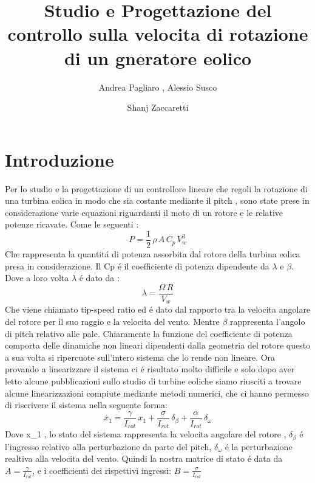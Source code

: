 \documentclass[a4paper,13pt]{article}
\begin{document}
\author{Andrea Pagliaro , Alessio Susco \and Shanj Zaccaretti}
\title{Studio e Progettazione del controllo sulla velocita di rotazione di un gneratore eolico}
\maketitle
\section{Introduzione}
Per lo studio e la progettazione di un controllore lineare che regoli la rotazione di una turbina eolica in modo che sia costante mediante il pitch , sono state prese in considerazione varie equazioni riguardanti il moto di un rotore e le relative potenze ricavate.
Come le seguenti :
\begin{equation}
P=\frac{1}{2}\,\rho\,A\,C_p\,V_w^3
\end{equation}
Che rappresenta la quantit\'a di potenza assorbita dal rotore della turbina eolica presa in considerazione.
Il Cp \'e il coefficiente di potenza dipendente da $\lambda$ e $\beta$.
Dove a loro volta $\lambda$ \'e dato da :
\begin{equation}
\lambda=\frac{\Omega\,R}{V_w}
\end{equation}
Che viene chiamato tip-speed ratio ed \'e dato dal rapporto tra la velocita angolare
del rotore per il suo raggio e la velocita del vento.
Mentre $\beta$ rappresenta l'angolo di pitch relativo alle pale.
Chiaramente la funzione del coefficiente di potenza comporta delle dinamiche non 
lineari dipendenti dalla geometria del rotore questo a sua volta si ripercuote sull'intero sistema che lo rende non lineare.  
Ora provando a linearizzare il sistema ci \'e risultato molto difficile e solo dopo aver letto alcune pubblicazioni sullo studio di turbine eoliche siamo riusciti a trovare alcune linearizzazioni compiute mediante metodi numerici, che ci hanno permesso di riscrivere il sistema nella seguente forma:
\begin{equation}
\dot{x_1}=\frac{\gamma}{I_{rot}}\,x_1+\frac{\sigma}{I_{rot}}\,\delta_\beta+\frac{\alpha}{I_{rot}}\,\delta_\omega
\end{equation}
Dove x_1 , lo stato del sistema rappresenta la velocita angolare del rotore ,
$\delta_\beta$ \'e l'ingresso relativo alla perturbazione da parte del pitch,
$\delta_\omega$ \'e la perturbazione realtiva alla velocita del vento.
Quindi la nostra matrice di stato \'e data da $A=\frac{\gamma}{I_{rot}}$,
e i coefficienti dei rispettivi ingressi:
$B=\frac{\sigma}{I_{rot}}$
\end{document}
